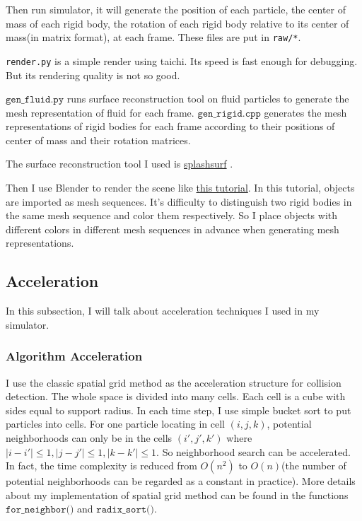 \documentclass[acmlarge]{acmart}
\begin{document}
Then run simulator, it will generate the position of each particle, the center of mass of each rigid body,
the rotation of each rigid body relative to its center of mass(in matrix format),
at each frame. These files are put in \texttt{raw/*}.

\texttt{render.py} is a simple render using taichi. Its speed is fast enough for debugging. But its rendering quality is not so good.

$\texttt{gen\_fluid.py}$ runs surface reconstruction tool on fluid particles to generate the mesh representation of fluid for each frame.
$\texttt{gen\_rigid.cpp}$ generates the mesh representations of rigid bodies for each frame according to their positions of center of mass and their rotation matrices.

The surface reconstruction tool I used is \href{https://github.com/InteractiveComputerGraphics/splashsurf}{splashsurf} \cite{LBJB23}.

Then I use Blender to render the scene like \href{https://blog.csdn.net/weixin_43940314/article/details/125260073}{this tutorial}.
In this tutorial, objects are imported as mesh sequences. It's difficulty to distinguish two rigid bodies in the same 
mesh sequence and color them respectively. So I place objects with different colors 
in different mesh sequences in advance when generating mesh representations.

\subsection{Acceleration}

In this subsection, I will talk about acceleration techniques I used in my simulator.

\subsubsection{Algorithm Acceleration}
I use the classic spatial grid method as the acceleration structure for collision detection.
The whole space is divided into many cells.
Each cell is a cube with sides equal to support radius.
In each time step, I use simple bucket sort to put particles into cells.
For one particle locating in cell $(i,j,k)$, potential neighborhoods can only be in the cells $(i',j',k')$ where
$|i-i'|\leq 1,|j-j'|\leq 1,|k-k'|\leq 1$. So neighborhood search can be accelerated. In fact, the time complexity 
is reduced from $O(n^2)$ to $O(n)$(the number of potential neighborhoods can be regarded as a constant in practice).
More details about my implementation of spatial grid method 
can be found in the functions $\texttt{for\_neighbor()}$ and $\texttt{radix\_sort()}$.
\end{document}
